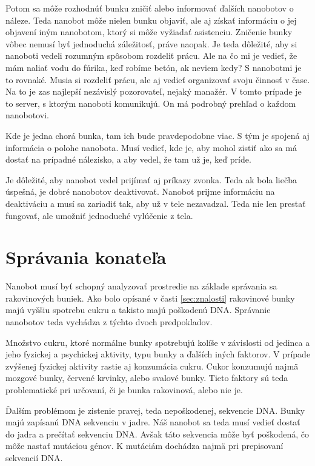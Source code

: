 \documentclass[10pt,twoside,slovak,a4paper]{article}
\begin{document}
Potom sa môže rozhodnúť bunku zničiť alebo informovať ďalších nanobotov o náleze. Teda nanobot môže nielen bunku objaviť, ale aj získať informáciu o jej objavení iným nanobotom, ktorý si môže vyžiadať asistenciu. Zničenie bunky vôbec nemusí byť jednoduchá záležitosť, práve naopak. Je teda dôležité, aby si nanoboti vedeli rozumným spôsobom rozdeliť prácu. Ale na čo mi je vedieť, že mám naliať vodu do fúrika, keď robíme betón, ak neviem kedy? S nanobotmi je to rovnaké. Musia si rozdeliť prácu, ale aj vedieť organizovať svoju činnosť v čase. Na to je zas najlepší nezávislý pozorovateľ, nejaký manažér. V tomto prípade je to server, s ktorým nanoboti komunikujú. On má podrobný prehľad o každom nanobotovi. 

Kde je jedna chorá bunka, tam ich bude pravdepodobne viac. S tým je spojená aj informácia o polohe nanobota. Musí vedieť, kde je, aby mohol zistiť ako sa má dostať na prípadné nálezisko, a aby vedel, že tam už je, keď príde.

Je dôležité, aby nanobot vedel prijímať aj príkazy zvonka. Teda ak bola liečba úspešná, je dobré nanobotov deaktivovať. Nanobot prijme informáciu na deaktiváciu a musí sa zariadiť tak, aby už v tele nezavadzal. Teda nie len prestať fungovať, ale umožniť jednoduché vylúčenie z tela.

\section{Správania konateľa}
\label{sec:spravanie}
Nanobot musí byť schopný analyzovať prostredie na základe správania sa rakovinových buniek. Ako bolo opísané v časti \ref{sec:znalosti} rakovinové bunky majú vyššiu spotrebu cukru a takisto majú poškodenú DNA. Správanie nanobotov teda vychádza z týchto dvoch predpokladov.

Množstvo cukru, ktoré normálne bunky spotrebujú kolíše v závislosti od jedinca a jeho fyzickej a psychickej aktivity, typu bunky a ďalších iných faktorov. V prípade zvýšenej fyzickej aktivity rastie aj konzumácia cukru. Cukor konzumujú najmä mozgové bunky, červené krvinky, alebo svalové bunky. Tieto faktory sú teda problematické pri určovaní, či je bunka rakovinová, alebo nie je.

Ďalším problémom je zistenie pravej, teda nepoškodenej, sekvencie DNA. Bunky majú zapísanú DNA sekvenciu v jadre. Náš nanobot sa teda musí vedieť dostať do jadra a prečítať sekvenciu DNA. Avšak táto sekvencia môže byť poškodená, čo môže nastať mutáciou génov. K mutáciám dochádza najmä pri prepisovaní sekvencií DNA.
\cite{Wikipedia-glukoza, Wikipedia-jadro, Wikipedia-mutations}
\end{document}
